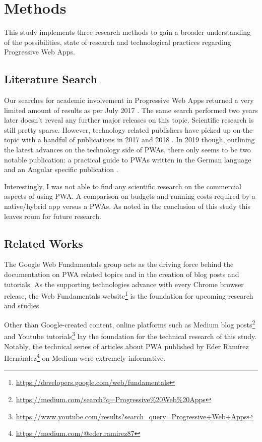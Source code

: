 \chapter{Methods}

This study implements three research methods to gain a broader understanding of the possibilities, state of research and technological practices regarding Progressive Web Apps.

\section{Literature Search}

Our searches for academic involvement in Progressive Web Apps returned a very limited amount of results as per July 2017 \citep{biorn-hansenProgressiveWebApps2018}. The same search performed two years later doesn't reveal any further major releases on this topic. Scientific research is still pretty sparse. However, technology related publishers have picked up on the topic with a handful of publications in 2017 and 2018 \citep{aterBuildingProgressiveWeb2017,humeProgressiveWebApps2018,loveProgressiveWebApplication2018,sheppardBeginningProgressiveWeb2017}. In 2019 though, outlining the latest advances on the technology side of PWAs, there only seems to be two notable publication: a practical guide to PWAs written in the German language \citep{liebelProgressiveWebApps2019} and an Angular specific publication \citep{hajianProgressiveWebApps2019}.

Interestingly, I was not able to find any scientific research on the commercial aspects of using PWA. A comparison on budgets and running costs required by a native/hybrid app versus a PWAs. As noted in the conclusion of this study this leaves room for future research.

\section{Related Works}
The Google Web Fundamentals group acts as the driving force behind the documentation on PWA related topics and in the creation of blog posts and tutorials. As the supporting technologies advance with every Chrome browser release, the Web Fundamentals website\footnote{\url{https://developers.google.com/web/fundamentals}} is the foundation for upcoming research and studies.

Other than Google-created content, online platforms such as Medium blog posts\footnote{\url{https://medium.com/search?q=Progressive\%20Web\%20Apps}} and Youtube tutorials\footnote{\url{https://www.youtube.com/results?search_query=Progressive+Web+Apps}} lay the foundation for the technical research of this study. Notably, the technical series of articles about PWA published by Eder Ramírez Hernández\footnote{\url{https://medium.com/@eder.ramirez87}} on Medium were extremely informative.

